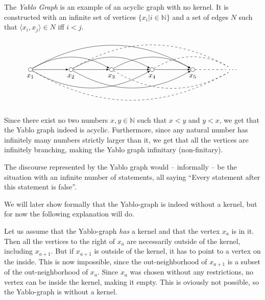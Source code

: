 The \textit{Yablo Graph}\cite{analysis-yablo} is an example of an acyclic graph with no kernel.
It is constructed with an infinite set of vertices $\{ x_i | i \in \mathbb{N} \}$ and a set of edges $N$ such that $\langle x_i, x_j \rangle \in N$ iff $i < j$.
\[
  \begin{tikzpicture}
    [
    point/.style={circle,draw,inner sep=0pt,minimum size=2mm},
    collection/.style={thick,rectangle,draw,inner sep=0pt,minimum height=14mm, minimum width= 9mm}
    ]
    \node (1) at (0,1) [point,label=below:$x_1$] {};
    \node (2) at (2,1) [point,label=below:$x_2$] {};
    \node (3) at (4,1) [point,label=below:$x_3$] {};
    \node (4) at (6,1) [point,label=below:$x_4$] {};
    \node (5) at (8,1) [point,label=below:$x_5$] {};
    \node (6) at (10,1) [] {$\dots$};
    \draw [-latex] (1) to (2);
    \draw [-latex] (2) to (3);
    \draw [-latex] (3) to (4);
    \draw [-latex] (4) to (5);
    \draw [dashed] (5) to (6);
    \draw [-latex, bend left] (1) to (3);
    \draw [-latex, bend left] (2) to (4);
    \draw [-latex, bend left] (3) to (5);
    \draw [dashed, bend left] (4) to (6);
    \draw [-latex, bend right] (1) to (4);
    \draw [-latex, bend right] (2) to (5);
    \draw [dashed, bend right] (3) to (6);
    \draw [-latex, bend left] (1) to (5);
    \draw [dashed, bend left] (2) to (6);
    \draw [dashed, bend right] (1) to (6);
  \end{tikzpicture}
\]
Since there exist no two numbers $x,y \in \mathbb{N}$ such that $x < y$ and $y < x$, we get that the Yablo graph indeed is acyclic.
Furthermore, since any natural number has infinitely many numbers strictly larger than it, we get that all the vertices are infinitely branching, making the Yablo graph infinitary (non-finitary).

The discourse represented by the Yablo graph would -- informally -- be the situation with an infinite number of statements, all saying ``Every statement after this statement is false''.

We will later show formally that the Yablo-graph is indeed without a kernel, but for now the following explanation will do.

Let us assume that the Yablo-graph \textit{has} a kernel and that the vertex $x_a$ is in it.
Then all the vertices to the right of $x_a$ are necessarily outside of the kernel, including $x_{a+1}$.
But if $x_{a+1}$ is outside of the kernel, it has to point to a vertex on the inside.
This is now impossible, since the out-neighborhood of $x_{a+1}$ is a subset of the out-neighborhood of $x_a$.
Since $x_a$ was chosen without any restrictions, no vertex can be inside the kernel, making it empty.
This is oviously not possible, so the Yablo-graph is without a kernel.

